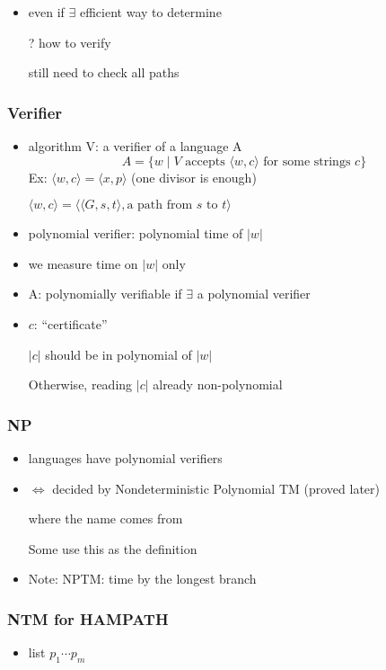 \begin{frame}[allowframebreaks]
\begin{itemize}
\item even if $\exists$ efficient way to determine

? how to verify

still need to check all paths

\end{itemize}\end{frame} \begin{frame}[allowframebreaks] \frametitle{Verifier}
  \begin{itemize}
\item algorithm V: a verifier of a language A
  \begin{equation*}
    A=\{w\mid
V \mbox{ accepts } 
\langle  w,c\rangle  
\mbox{ for some strings } c\}
  \end{equation*}
Ex: $\langle  w,c\rangle  = \langle  x,p\rangle $ (one divisor is enough)

$\langle  w,c\rangle  = \langle  \langle  G,s,t\rangle , \mbox{a path from $s$ to $t$}\rangle $
\item polynomial verifier: polynomial time of $|w|$
\item we measure time on $|w|$ only

\item A: polynomially verifiable if 
$\exists$ a polynomial verifier
\item $c$: ``certificate''

$|c|$ should be in polynomial of $|w|$

Otherwise, reading $|c|$ already non-polynomial
\end{itemize}\end{frame} \begin{frame}[allowframebreaks] \frametitle{NP}
  \begin{itemize}
\item languages have polynomial verifiers
\item $\Leftrightarrow$ decided by 
Nondeterministic Polynomial TM (proved later)

where the name comes from

Some use this as the definition

\item Note: NPTM: time by the longest branch

\end{itemize}\end{frame} \begin{frame}[allowframebreaks] \frametitle{NTM for HAMPATH}
  \begin{itemize}
\item list $p_1\cdots p_m$


\end{itemize}
\end{frame}
